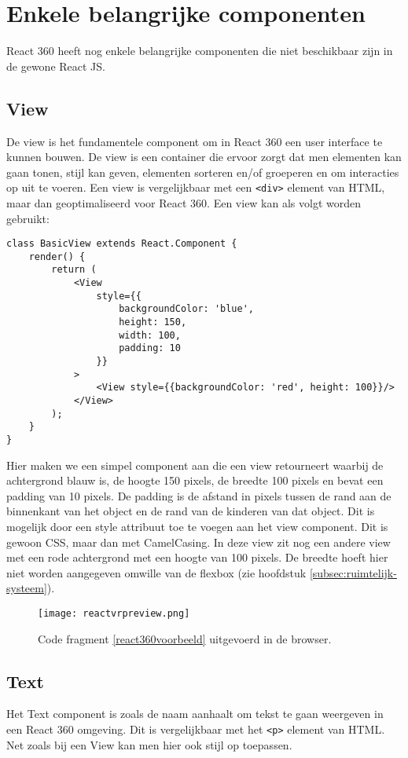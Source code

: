 \section{Enkele belangrijke componenten}
\label{sec:reactvr-componenten}
React 360 heeft nog enkele belangrijke componenten die niet beschikbaar zijn in de gewone React JS.

\subsection{View}
\label{subsec:view}
De view is het fundamentele component om in React 360 een user interface te kunnen bouwen. De view is een container die ervoor zorgt dat men elementen kan gaan tonen, stijl kan geven, elementen sorteren en/of groeperen en om interacties op uit te voeren. Een view is vergelijkbaar met een \lstinline[basicstyle=\ttfamily\color{red}]|<div>| element van HTML, maar dan geoptimaliseerd voor React 360. Een view kan als volgt worden gebruikt:

\begin{lstlisting}[frame=single, caption=Een component die een View teruggeeft., label={react360voorbeeld}]
class BasicView extends React.Component {
	render() {
		return (
			<View 
				style={{
					backgroundColor: 'blue',
					height: 150,
					width: 100,
					padding: 10
				}}
			>
				<View style={{backgroundColor: 'red', height: 100}}/>
			</View>
		);
	}
}
\end{lstlisting}

Hier maken we een simpel component aan die een view retourneert waarbij de achtergrond blauw is, de hoogte 150 pixels, de breedte 100 pixels en bevat een padding van 10 pixels. De padding is de afstand in pixels tussen de rand aan de binnenkant van het object en de rand van de kinderen van dat object. Dit is mogelijk door een style attribuut toe te voegen aan het view component. Dit is gewoon CSS, maar dan met CamelCasing. In deze view zit nog een andere view met een rode achtergrond met een hoogte van 100 pixels. De breedte hoeft hier niet worden aangegeven omwille van de flexbox (zie hoofdstuk \ref{subsec:ruimtelijk-systeem}).

\begin{figure}[h]
	\centering
	\texttt{[image: reactvrpreview.png]}
	\caption{Code fragment \ref{react360voorbeeld} uitgevoerd in de browser.}
	\label{fig:react360preview}
\end{figure}


\subsection{Text}
\label{subsec:text}
Het Text component is zoals de naam aanhaalt om tekst te gaan weergeven in een React 360 omgeving. Dit is vergelijkbaar met het \lstinline[basicstyle=\ttfamily\color{red}]|<p>| element van HTML. Net zoals bij een View kan men hier ook stijl op toepassen.

